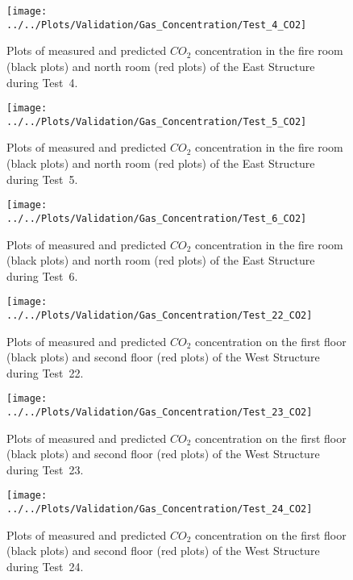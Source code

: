\begin{figure}[!h]
	\centering
	\texttt{[image: ../../Plots/Validation/Gas\_Concentration/Test\_4\_CO2]}
	\caption[Plots of measured and predicted $CO_2$ concentration during Test~4.]{Plots of measured and predicted $CO_2$ concentration in the fire room (black plots) and north room (red plots) of the East Structure during Test~4.}
	\label{fig:Test4_CO2}
\end{figure}

\begin{figure}[!h]
	\centering
	\texttt{[image: ../../Plots/Validation/Gas\_Concentration/Test\_5\_CO2]}
	\caption[Plots of measured and predicted $CO_2$ concentration during Test~5.]{Plots of measured and predicted $CO_2$ concentration in the fire room (black plots) and north room (red plots) of the East Structure during Test~5.}
	\label{fig:Test5_CO2}
\end{figure}

\begin{figure}[!h]
	\centering
	\texttt{[image: ../../Plots/Validation/Gas\_Concentration/Test\_6\_CO2]}
	\caption[Plots of measured and predicted $CO_2$ concentration during Test~6.]{Plots of measured and predicted $CO_2$ concentration in the fire room (black plots) and north room (red plots) of the East Structure during Test~6.}
	\label{fig:Test6_CO2}
\end{figure}

\begin{figure}[!h]
	\centering
	\texttt{[image: ../../Plots/Validation/Gas\_Concentration/Test\_22\_CO2]}
	\caption[Plots of measured and predicted $CO_2$ concentration during Test~22.]{Plots of measured and predicted $CO_2$ concentration on the first floor (black plots) and second floor (red plots) of the West Structure during Test~22.}
	\label{fig:Test22_CO2}
\end{figure}

\begin{figure}[!h]
	\centering
	\texttt{[image: ../../Plots/Validation/Gas\_Concentration/Test\_23\_CO2]}
	\caption[Plots of measured and predicted $CO_2$ concentration during Test~23.]{Plots of measured and predicted $CO_2$ concentration on the first floor (black plots) and second floor (red plots) of the West Structure during Test~23.}
	\label{fig:Test23_CO2}
\end{figure}

\begin{figure}[!h]
	\centering
	\texttt{[image: ../../Plots/Validation/Gas\_Concentration/Test\_24\_CO2]}
	\caption[Plots of measured and predicted $CO_2$ concentration during Test~24.]{Plots of measured and predicted $CO_2$ concentration on the first floor (black plots) and second floor (red plots) of the West Structure during Test~24.}
	\label{fig:Test24_CO2}
\end{figure}

